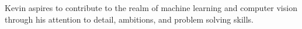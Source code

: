 

\begin{cvparagraph}

Kevin aspires to contribute to the realm of machine learning and computer vision through his attention to detail, ambitions, and problem solving skills.
\end{cvparagraph}
